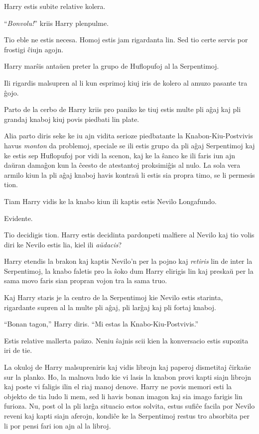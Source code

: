 Harry estis subite relative kolera.

``\emph{Bonvolu!}'' kriis Harry plenpulme.

Tio eble ne estis necesa. Homoj estis jam rigardanta lin. Sed tio certe servis
por frostigi ĉiujn agojn.

Harry marŝis antaŭen preter la grupo de Huflopufoj al la Serpentimoj.

Ili rigardis malsupren al li kun esprimoj kiuj iris de kolero al amuzo pasante
tra ĝojo.

Parto de la cerbo de Harry kriis pro paniko ke tiuj estis multe pli
aĝaj kaj pli grandaj knaboj kiuj povis piedbati lin plate.

Alia parto diris seke ke iu ajn vidita serioze piedbatante la
Knabon-Kiu-Postvivis havus \emph{monton} da problemoj, speciale se ili estis
grupo da pli aĝaj Serpentimoj kaj ke estis sep Huflopufoj por vidi la scenon,
kaj ke la ŝanco ke ili faris iun ajn daŭran damaĝon kun la ĉeesto de atestantoj
proksimiĝis al nulo. La sola vera armilo kiun la pli aĝaj knaboj havis kontraŭ li
estis sia propra timo, se li permesis tion.

Tiam Harry vidis ke la knabo kiun ili kaptis estis Nevilo Longafundo.

Evidente.

Tio decidigis tion. Harry estis decidinta pardonpeti malfiere al Nevilo kaj tio
volis diri ke Nevilo estis lia, kiel ili \emph{aŭdacis}?

Harry etendis la brakon kaj kaptis Nevilo'n per la pojno kaj
\emph{retiris} lin de inter la Serpentimoj, la knabo faletis pro la
ŝoko dum Harry elirigis lin kaj preskaŭ per la sama movo faris
sian propran vojon tra la sama truo.

Kaj Harry staris je la centro de la Serpentimoj kie Nevilo estis
starinta, rigardante supren al la multe pli aĝaj, pli larĝaj kaj
pli fortaj knaboj.

``Bonan tagon,'' Harry diris. ``Mi estas la Knabo-Kiu-Postvivis.''

Estis relative mallerta paŭzo. Neniu ŝajnis scii kien la
konversacio estis supozita iri de tie.

La okuloj de Harry malsupreniris kaj vidis librojn kaj paperoj dismetitaj
ĉirkaŭe sur la planko. Ho, la malnova ludo kie vi lasis la knabon provi kapti
siajn librojn kaj poste vi faligis ilin el riaj manoj denove. Harry ne povis
memori esti la objekto de tia ludo li mem, sed li havis bonan imagon kaj sia
imago farigis lin furioza. Nu, post ol la pli larĝa situacio estos solvita,
estus sufiĉe facila por Nevilo reveni kaj kapti siajn aferojn, kondiĉe ke la
Serpentimoj restus tro absorbita per li por pensi fari ion ajn al la libroj.

